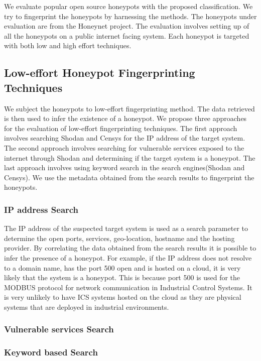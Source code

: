 \documentclass[../main.tex]{subfiles}
\begin{document}
We evaluate popular open source honeypots with the proposed classification. We try to fingerprint the honeypots by harnessing the methods. The honeypots under evaluation are from the Honeynet project. The evaluation involves setting up of all the honeypots on a public internet facing system. Each honeypot is targeted with both low and high effort techniques. 
 
\subsection{Low-effort Honeypot Fingerprinting Techniques}
 We subject the honeypots to low-effort fingerprinting method. The data retrieved is then used to infer the existence of a honeypot. We propose three approaches for the evaluation of low-effort fingerprinting techniques. The first approach involves searching Shodan and Censys for the IP address of the target system. The second approach involves searching for vulnerable services exposed to the internet through Shodan and determining if the target system is a honeypot. The last approach involves using keyword search in the search engines(Shodan and Censys). We use the metadata obtained from the search results to fingerprint the honeypots. 
 
 \subsubsection{IP address Search}
The IP address of the suspected target system is used as a search parameter to determine the open ports, services, geo-location, hostname and the hosting provider. By correlating the data obtained from the search results it is possible to infer the presence of a honeypot. For example, if the IP address does not resolve to a domain name, has the port 500 open and is hosted on a cloud, it is very likely that the system is a honeypot. This is because port 500 is used for the MODBUS protocol for network communication in Industrial Control Systems. It is very unlikely to have ICS systems hosted on the cloud as they are physical systems that are deployed in industrial environments.  

 \subsubsection{Vulnerable services Search}
 
 \subsubsection{Keyword based Search}
 
\end{document}

